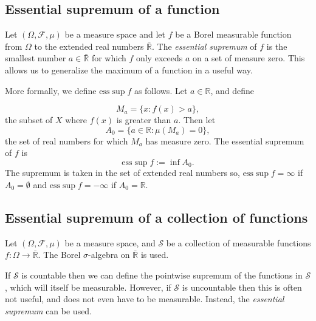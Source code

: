\documentclass[12pt]{article}
\newcommand{\reals}{\mathbb{R}}
\newcommand{\set}[1]{\{#1\}}
\newcommand{\defined}{:=}
\begin{document}

\subsection*{Essential supremum of a function}

Let $(\Omega, \mathcal{F}, \mu)$ be a measure space and let $f$ be a Borel measurable function from $\Omega$ to the extended real numbers $\mathbb{\bar R}$.  The \emph{essential supremum} of $f$ is the smallest number $a\in\mathbb{\bar R}$ for which $f$ only exceeds $a$ on a set of measure zero. This allows us to generalize the maximum of a function in a useful way.

More formally, we define $\mathrm{ess } \sup f$ as follows.  Let $a \in \reals$, and define

\begin{equation*}
M_{a} = \set{x: f(x) > a},
\end{equation*}
the subset of $X$ where $f(x)$ is greater than $a$.  Then let
\begin{equation*}
A_{0} = \set{a \in \reals: \mu(M_a) = 0},
\end{equation*}
the set of real numbers for which $M_a$ has measure zero. The essential supremum of $f$ is
\begin{equation*}
\mathrm{ess } \sup f \defined \inf A_0.
\end{equation*}
The supremum is taken in the set of extended real numbers so, $\mathrm{ess}\sup f=\infty$ if $A_0=\emptyset$ and $\mathrm{ess}\sup f = -\infty$ if $A_0=\mathbb{R}$. 

\subsection*{Essential supremum of a collection of functions}

Let $(\Omega,\mathcal{F},\mu)$ be a measure space, and $\mathcal{S}$ be a collection of measurable functions $f\colon\Omega\rightarrow\mathbb{\bar R}$. The Borel $\sigma$-algebra on $\mathbb{\bar R}$ is used.

If $\mathcal{S}$ is countable then we can define the pointwise supremum of the functions in $\mathcal{S}$, which will itself be measurable. However, if $\mathcal{S}$ is uncountable then this is often not useful, and does not even have to be measurable. Instead, the \emph{essential supremum} can be used.
\end{document}
